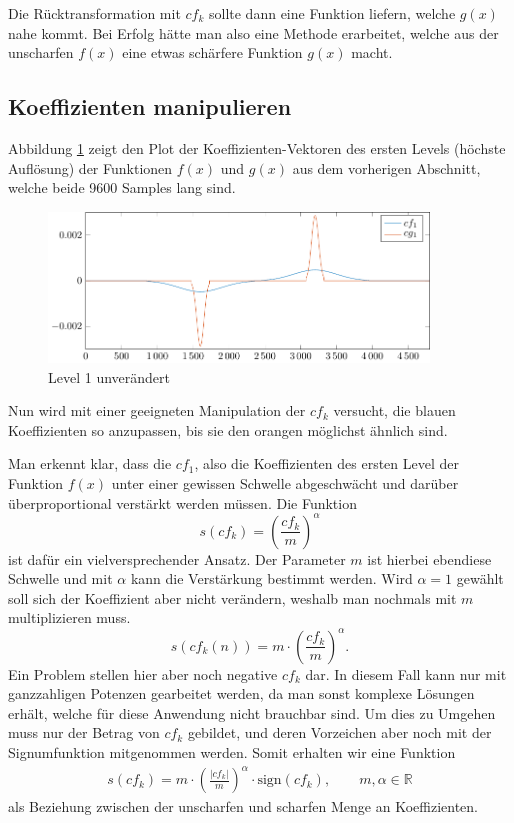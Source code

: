 Die Rücktransformation mit $cf_k$ sollte dann eine Funktion liefern, welche $g(x)$ nahe kommt.
Bei Erfolg hätte man also eine Methode erarbeitet, welche aus der \glqq unscharfen\grqq{} $f(x)$ eine etwas \glqq schärfere\grqq{} Funktion $g(x)$ macht. 

\subsection{Koeffizienten manipulieren}
Abbildung \ref{deconvolve:level1} zeigt den Plot der Koeffizienten-Vektoren des ersten Levels (höchste Auflösung) der Funktionen $f(x)$ und $g(x)$ aus dem vorherigen Abschnitt, welche beide 9600 Samples lang sind.
\begin{figure}[h]
\centering
\includegraphics[width=0.9\textwidth]{./papers/deconvolve/pictures/level/level1.pdf}
\caption{Level 1 unverändert\label{deconvolve:level1}}
\end{figure}

Nun wird mit einer geeigneten Manipulation der $cf_k$ versucht, die blauen Koeffizienten so anzupassen, bis sie den orangen möglichst ähnlich sind.

Man erkennt klar, dass die $cf_1$, also die Koeffizienten des ersten Level der Funktion $f(x)$ unter einer gewissen Schwelle abgeschwächt und darüber überproportional verstärkt werden müssen.
Die Funktion
$$s(cf_k) = \left( \frac{cf_k}{m}\right)^\alpha$$
ist dafür ein vielversprechender Ansatz.
Der Parameter $m$ ist hierbei ebendiese Schwelle und mit $\alpha$ kann die Verstärkung bestimmt werden.
Wird $\alpha = 1$ gewählt soll sich der Koeffizient aber nicht verändern, weshalb man nochmals mit $m$ multiplizieren muss.
$$s(cf_k(n)) = m\cdot \left( \frac{cf_k}{m}\right)^\alpha.$$
Ein Problem stellen hier aber noch negative $cf_k$ dar. In diesem Fall kann nur mit ganzzahligen Potenzen gearbeitet werden, da man sonst komplexe Lösungen erhält, welche für diese Anwendung nicht brauchbar sind.
Um dies zu Umgehen muss nur der Betrag von $cf_k$ gebildet, und deren Vorzeichen aber noch mit der Signumfunktion mitgenommen werden.
Somit erhalten wir eine Funktion
\begin{align}
s(cf_k)=m\cdot \left(\frac{|cf_k|}{m}\right)^{\alpha}\cdot \text{sign}(cf_k), \qquad m,\alpha\in\mathbb{R}
\label{deconvolve:funktion}
\end{align}
als Beziehung zwischen der \glqq unscharfen\grqq{} und \glqq scharfen\grqq{} Menge an Koeffizienten.

